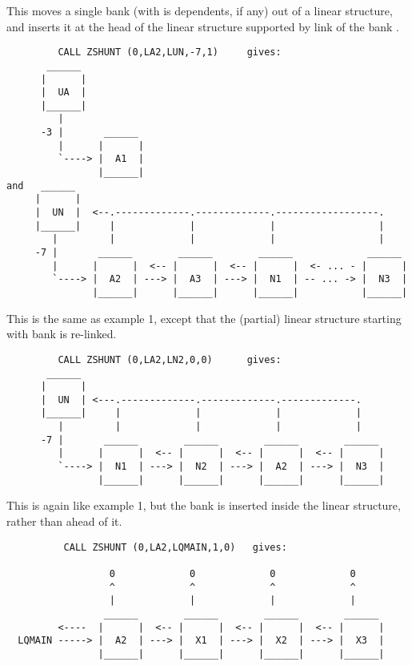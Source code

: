 This moves a single bank (with is dependents, if any) out of
a linear structure, and inserts it at the head of the linear
structure supported by link  of the bank .

\begin{verbatim}
         CALL ZSHUNT (0,LA2,LUN,-7,1)     gives:
       ______
      |      |
      |  UA  |
      |______|
         |
      -3 |       ______
         |      |      |
         `----> |  A1  |
                |______|
and   ______
     |      |
     |  UN  |  <--.-------------.-------------.------------------.
     |______|     |             |             |                  |
        |         |             |             |                  |
     -7 |       ______        ______        ______             ______
        |      |      |  <-- |      |  <-- |      |  <- ... - |      |
        `----> |  A2  | ---> |  A3  | ---> |  N1  | -- ... -> |  N3  |
               |______|      |______|      |______|           |______|
\end{verbatim} 
This is the same as example 1, except that the (partial) linear
structure starting with bank  is re-linked.


\begin{verbatim}
         CALL ZSHUNT (0,LA2,LN2,0,0)      gives:
       ______
      |      |
      |  UN  | <---.-------------.-------------.-------------.
      |______|     |             |             |             |
         |         |             |             |             |
      -7 |       ______        ______        ______        ______
         |      |      |  <-- |      |  <-- |      |  <-- |      |
         `----> |  N1  | ---> |  N2  | ---> |  A2  | ---> |  N3  |
                |______|      |______|      |______|      |______|
\end{verbatim} 
This is again like example 1, but the bank is inserted inside
the linear structure, rather than ahead of it.

\begin{verbatim}
          CALL ZSHUNT (0,LA2,LQMAIN,1,0)   gives:

                  0             0             0             0
                  ^             ^             ^             ^
                  |             |             |             |
                 ______        ______        ______        ______
         <----  |      |  <-- |      |  <-- |      |  <-- |      |
  LQMAIN -----> |  A2  | ---> |  X1  | ---> |  X2  | ---> |  X3  |
                |______|      |______|      |______|      |______|
\end{verbatim} 

